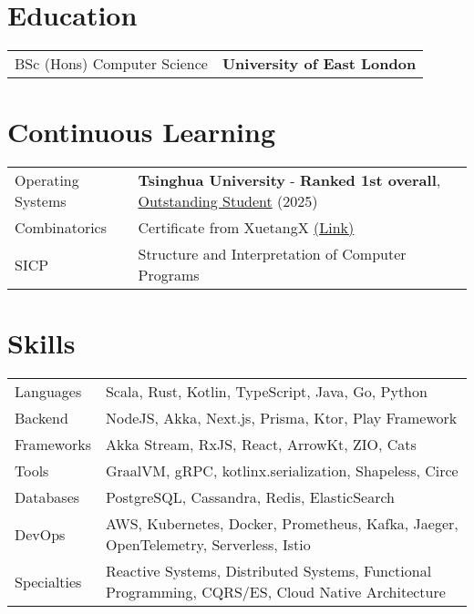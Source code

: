 \documentclass[a4paper,12pt]{article}
\begin{document}
\section{Education}
\begin{tabularx}{\linewidth}{@{}l X@{}}	
BSc (Hons) Computer Science & \textbf{University of East London} \\
\end{tabularx}

\section{Continuous Learning}
\begin{tabularx}{\linewidth}{@{}l X@{}}	
Operating Systems & \textbf{Tsinghua University} - \textbf{Ranked 1st overall}, \href{https://opencamp.cn/os2edu/student/camp/2025spring/excellent}{Outstanding Student} (2025) \\
Combinatorics & Certificate from XuetangX \href{https://v1-www.xuetangx.com/download_credential/DaVObVx0vXL.pdf}{(Link)} \\
SICP & Structure and Interpretation of Computer Programs \\
\end{tabularx}

\section{Skills}
\begin{tabularx}{\linewidth}{@{}l X@{}}
Languages &  \normalsize{Scala, Rust, Kotlin, TypeScript, Java, Go, Python}\\
Backend  &  \normalsize{NodeJS, Akka, Next.js, Prisma, Ktor, Play Framework}\\
Frameworks & \normalsize{Akka Stream, RxJS, React, ArrowKt, ZIO, Cats}\\
Tools & \normalsize{GraalVM, gRPC, kotlinx.serialization, Shapeless, Circe}\\
Databases &  \normalsize{PostgreSQL, Cassandra, Redis, ElasticSearch}\\
DevOps & \normalsize{AWS, Kubernetes, Docker, Prometheus, Kafka, Jaeger, OpenTelemetry, Serverless, Istio}\\
Specialties & \normalsize{Reactive Systems, Distributed Systems, Functional Programming, CQRS/ES, Cloud Native Architecture}\\
\end{tabularx}

\vfill
{}
\end{document}
